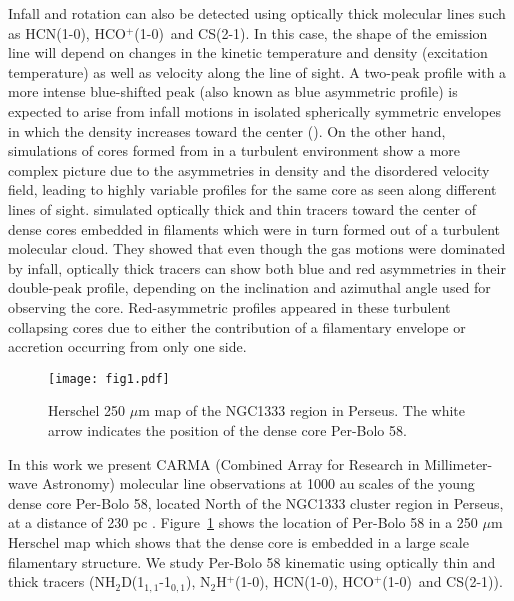 \documentclass[iop]{emulateapj}
\newcommand{\nhtd}{\mbox{\rm NH$_2$D(1$_{1,1}$-1$_{0,1}$)}}
\newcommand{\nthp}{\mbox{\rm N$_2$H$^+$(1-0)}}
\newcommand{\hcn}{\mbox{\rm HCN(1-0)}}
\newcommand{\hcop}{\mbox{\rm  HCO$^+$(1-0)}}
\newcommand{\cs}{\mbox{\rm CS(2-1)}}
\begin{document}
Infall and rotation can also be detected using optically thick molecular lines such as \hcn, \hcop\ and \cs. In this case, the shape of the emission line will depend on changes in the kinetic temperature and density (excitation temperature) as well as velocity along the line of sight. A two-peak profile with a more intense blue-shifted peak (also known as blue asymmetric profile) is expected to arise from infall motions in isolated spherically symmetric envelopes in which the density increases toward the center (\citealt{1999EvansPhysical,2011TomisakaObservational}). On the other hand, simulations of cores formed from in a turbulent environment show a more complex picture due to the asymmetries in density and the disordered velocity field, leading to highly variable profiles for the same core as seen along different lines of sight. \cite{2012SmithLine} simulated optically thick and thin tracers toward the center of dense cores embedded in filaments which were in turn formed out of a turbulent molecular cloud. They showed that even though the gas motions were dominated by infall, optically thick tracers can show both blue and red asymmetries in their double-peak profile, depending on the inclination and azimuthal angle used for observing the core. Red-asymmetric profiles appeared in these turbulent collapsing cores due to either the contribution of a filamentary envelope or accretion occurring from only one side.\\

\begin{figure}
\center
\texttt{[image: fig1.pdf]}
\caption{Herschel 250 $\mu$m map of the NGC1333 region in Perseus. The white arrow indicates the position of the dense core Per-Bolo 58.\label{fig:herschel}}
\end{figure}

In this work we present CARMA (Combined Array for Research in Millimeter-wave Astronomy) molecular line observations at 1000 au scales of the young dense core Per-Bolo 58, located North of the NGC1333 cluster region in Perseus, at a distance of 230 pc \citep{2008HirotaAstrometry}. Figure~\ref{fig:herschel} shows the location of Per-Bolo 58 in a 250 $\mu$m Herschel map which shows that the dense core is embedded in a large scale filamentary structure. We study Per-Bolo 58 kinematic using optically thin and thick tracers (\nhtd, \nthp, \hcn, \hcop\ and \cs). \\
\end{document}
